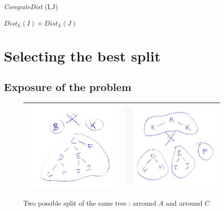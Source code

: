 \documentclass[a4paper]{article}
\begin{document}
\begin{algorithm}
\caption{{\it ComputeDist} (I,J)}
\begin{algorithmic}
       \STATE {}
    \ELSE
              \STATE \RETURN $Dist_L(I) + Dist_L(J)$
             \ENDIF
        \ENDFOR
    \ENDIF
\end{algorithmic}
\label{AlgoComp}
\end{algorithm}


\section{Selecting the best split}

\subsection{Exposure of the problem}
\label{SubSel}

\begin{figure}
\centering
\begin{tabular}{||c|c||}
 \hline \hline
\includegraphics[width=5cm]{FIGS/FTD-SplitA.jpg} &
\includegraphics[width=5cm]{FIGS/FTD-SplitC.jpg} 
 \\ \hline \hline
\end{tabular}
\caption{Two possible split of the same tree : arround $A$ and arround $C$}
\label{TreeSplit}
\end{figure}
\end{document}
